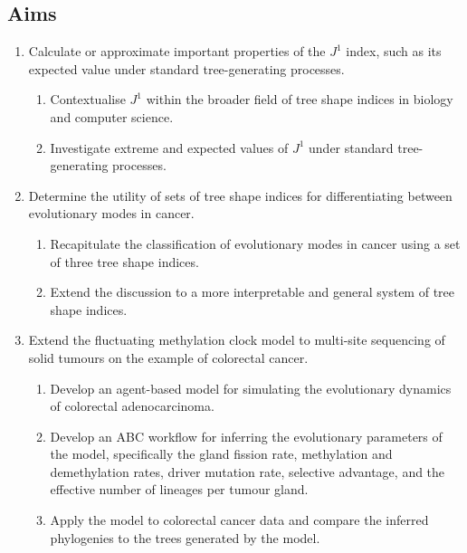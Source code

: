 \subsection{Aims}
\begin{enumerate}
    \item Calculate or approximate important properties of the $J^1$ index, such as its expected value under
        standard tree-generating processes.
        \begin{enumerate}
            \item Contextualise $J^1$ within the broader field of tree shape indices in biology and computer science.
            \item Investigate extreme and expected values of $J^1$ under standard tree-generating processes.
        \end{enumerate}
    \item Determine the utility of sets of tree shape indices for differentiating between evolutionary modes in cancer.
        \begin{enumerate}
            \item Recapitulate the classification of evolutionary modes in cancer using a set of three tree shape indices.
            \item Extend the discussion to a more interpretable and general system of tree shape indices.
        \end{enumerate}
    \item Extend the fluctuating methylation clock model to multi-site sequencing of solid tumours on the
        example of colorectal cancer.
        \begin{enumerate}
            \item Develop an agent-based model for simulating the evolutionary dynamics of colorectal adenocarcinoma.
            \item Develop an ABC workflow for inferring the evolutionary parameters of the model, specifically the
                gland fission rate, methylation and demethylation rates, driver mutation rate, selective advantage,
                and the effective number of lineages per tumour gland.
            \item Apply the model to colorectal cancer data and compare the inferred phylogenies to the trees generated
                by the model.
        \end{enumerate}
\end{enumerate}
